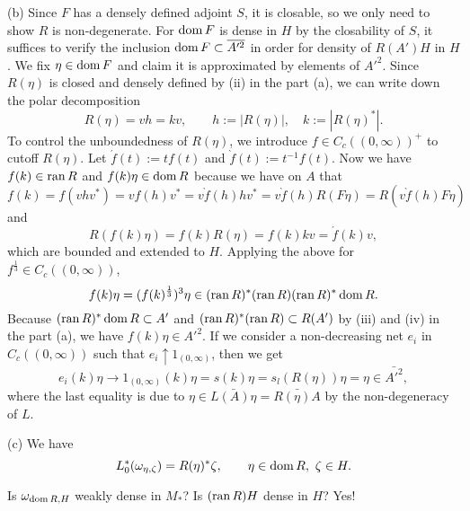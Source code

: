 \documentclass{../../large}
\begin{document}
\begin{pf}
(b)
Since $F$ has a densely defined adjoint $S$, it is closable, so we only need to show $R$ is non-degenerate.
For $\operatorname{dom} F$ is dense in $H$ by the closability of $S$, it suffices to verify the inclusion $\operatorname{dom} F\subset\overline{A'^2}$ in order for density of $R(A')H$ in $H$.
We fix $\eta\in\operatorname{dom} F$ and claim it is approximated by elements of $A'^2$.
Since $R(\eta)$ is closed and densely defined by (ii) in the part (a), we can write down the polar decomposition
\[R(\eta)=vh=kv,\qquad h:=|R(\eta)|,\quad k:=|R(\eta)^*|.\]
To control the unboundedness of $R(\eta)$, we introduce $f\in C_c((0,\infty))^+$ to cutoff $R(\eta)$.
Let $\acute f(t):=tf(t)$ and $\grave f(t):=t^{-1}f(t)$.
Now we have $f(k)\in\operatorname{ran} R$ and $f(k)\eta\in\operatorname{dom} R$ because we have on $A$ that
\[f(k)=f(vhv^*)=vf(h)v^*=v\grave f(h)hv^*=v\grave f(h)R(F\eta)=R\left(v\grave f(h)F\eta\right)\]
and
\[R(f(k)\eta)=f(k)R(\eta)=f(k)kv=\acute f(k)v,\]
which are bounded and extended to $H$.
Applying the above for $f^{\frac13}\in C_c((0,\infty))$, 
\[f(k)\eta=(f(k)^{\frac13})^3\eta\in(\operatorname{ran} R)^*(\operatorname{ran} R)(\operatorname{ran} R)^*\operatorname{dom} R.\]
Because $(\operatorname{ran} R)^*\operatorname{dom} R\subset A'$ and $(\operatorname{ran} R)^*(\operatorname{ran} R)\subset R(A')$ by (iii) and (iv) in the part (a), we have $f(k)\eta\in A'^2$.
If we consider a non-decreasing net $e_i$ in $C_c((0,\infty))$ such that $e_i\uparrow1_{(0,\infty)}$, then we get
\[e_i(k)\eta\to1_{(0,\infty)}(k)\eta=s(k)\eta=s_l(R(\eta))\eta=\eta\in\bar{A'^2},\]
where the last equality is due to $\eta\in\bar{L(A)\eta}=\bar{R(\eta)A}$ by the non-degeneracy of $L$.

(c)
We have
\[L_0^*(\omega_{\eta,\zeta})=R(\eta)^*\zeta,\qquad\eta\in\operatorname{dom} R,\ \zeta\in H.\]

Is $\omega_{\operatorname{dom} R,H}$ weakly dense in $M_*$?
Is $(\operatorname{ran} R)H$ dense in $H$?
Yes!
\end{pf}
\end{document}
